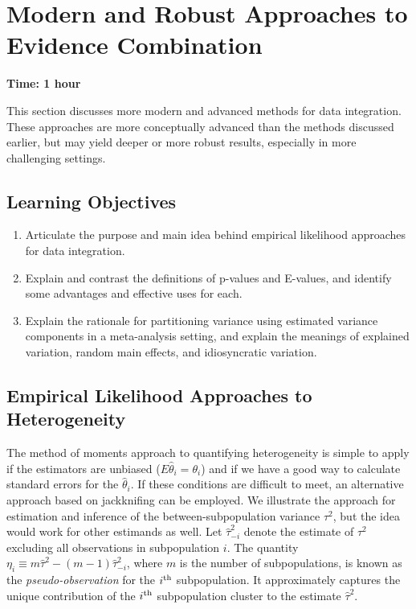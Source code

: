 \section{Modern and Robust Approaches to Evidence Combination}
\label{sec:6.3}

\textbf{Time: 1 hour}

This section discusses more modern and advanced methods for data integration. These approaches are more conceptually advanced than the methods discussed earlier, but may yield deeper or more robust results, especially in more challenging settings.

\subsection{Learning Objectives}

\begin{enumerate}
    \item Articulate the purpose and main idea behind empirical likelihood approaches for data integration.
    \item Explain and contrast the definitions of p-values and E-values, and identify some advantages and effective uses for each.
    \item Explain the rationale for partitioning variance using estimated variance components in a meta-analysis setting, and explain the meanings of explained variation, random main effects, and idiosyncratic variation.
\end{enumerate}

\subsection{Empirical Likelihood Approaches to Heterogeneity}

The method of moments approach to quantifying heterogeneity is simple to apply if the estimators are unbiased ($E\hat{\theta}_i = \theta_i$) and if we have a good way to calculate standard errors for the $\hat{\theta}_i$. If these conditions are difficult to meet, an alternative approach based on jackknifing can be employed. We illustrate the approach for estimation and inference of the between-subpopulation variance $\tau^2$, but the idea would work for other estimands as well. Let $\hat{\tau}^2_{-i}$ denote the estimate of $\tau^2$ excluding all observations in subpopulation $i$. The quantity $\eta_i \equiv m\hat{\tau}^2 - (m - 1)\hat{\tau}_{-i}^2$, where $m$ is the number of subpopulations, is known as the \textit{pseudo-observation} for the $i^{\rm th}$ subpopulation. It approximately captures the unique contribution of the $i^{\rm th}$ subpopulation cluster to the estimate $\hat{\tau}^2$.

